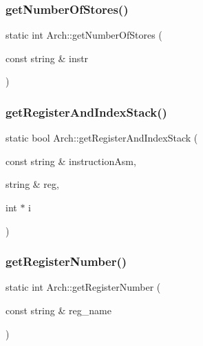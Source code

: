 \mbox{\label{classArch_a16b3caaf64787815c74d2a1e73ccc64e}} 
\subsubsection{\texorpdfstring{get\+Number\+Of\+Stores()}{getNumberOfStores()}}
{\footnotesize\ttfamily static int Arch\+::get\+Number\+Of\+Stores (\begin{DoxyParamCaption}\item[{const string \&}]{instr }\end{DoxyParamCaption})\hspace{0.3cm}{\ttfamily [static]}}

\mbox{\label{classArch_aa364e6f5826999632dd128a19fc3d587}} 
\subsubsection{\texorpdfstring{get\+Register\+And\+Index\+Stack()}{getRegisterAndIndexStack()}}
{\footnotesize\ttfamily static bool Arch\+::get\+Register\+And\+Index\+Stack (\begin{DoxyParamCaption}\item[{const string \&}]{instruction\+Asm,  }\item[{string \&}]{reg,  }\item[{int $\ast$}]{i }\end{DoxyParamCaption})\hspace{0.3cm}{\ttfamily [static]}}

\mbox{\label{classArch_ad443b9fd33ae50f27aec5263ba980c47}} 
\subsubsection{\texorpdfstring{get\+Register\+Number()}{getRegisterNumber()}}
{\footnotesize\ttfamily static int Arch\+::get\+Register\+Number (\begin{DoxyParamCaption}\item[{const string \&}]{reg\+\_\+name }\end{DoxyParamCaption})\hspace{0.3cm}{\ttfamily [static]}}

